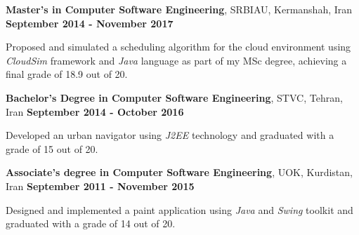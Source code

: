 
\begin{scholarship}
\scholarshipentry{}
{\textbf{Master's in Computer Software Engineering}, SRBIAU, Kermanshah, Iran \hspace{63 pt } \textbf{September 2014 - November 2017}

Proposed and simulated a scheduling algorithm for the cloud environment using \textit{CloudSim} framework and \textit{Java} language as part of my MSc degree, achieving a final grade of 18.9 out of 20. \vspace{5 pt}
}
\scholarshipentry{}
				{\textbf{Bachelor's Degree in Computer Software Engineering}, STVC, Tehran, Iran \hspace{69 pt} \textbf{September 2014 - October 2016}
 
Developed an urban navigator using \textit{J2EE} technology and graduated with a grade of 15 out of 20. \vspace{5 pt}	
}		
\scholarshipentry{}
				{\textbf{Associate's degree in Computer Software Engineering}, UOK, Kurdistan, Iran \hspace{50 pt} \textbf{September 2011 - November 2015}
 
Designed and implemented a paint application using \textit{Java} and \textit{Swing} toolkit and graduated with a grade of 14 out of 20.
}
\end{scholarship}
